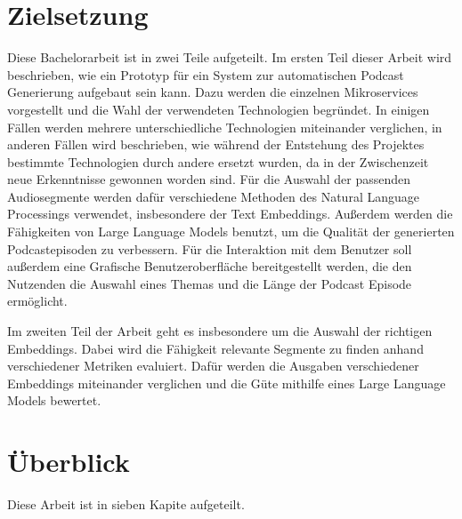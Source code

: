 



\section{Zielsetzung}

Diese Bachelorarbeit ist in zwei Teile aufgeteilt.
Im ersten Teil dieser Arbeit wird beschrieben, wie ein Prototyp für ein System zur automatischen Podcast Generierung aufgebaut sein kann.
Dazu werden die einzelnen Mikroservices vorgestellt und die Wahl der verwendeten Technologien begründet.
In einigen Fällen werden mehrere unterschiedliche Technologien miteinander verglichen, in anderen Fällen wird beschrieben, wie während der Entstehung des Projektes bestimmte Technologien durch andere ersetzt wurden, da in der Zwischenzeit neue Erkenntnisse gewonnen worden sind.
Für die Auswahl der passenden Audiosegmente werden dafür verschiedene Methoden des Natural Language Processings verwendet, insbesondere der Text Embeddings.
Außerdem werden die Fähigkeiten von Large Language Models benutzt, um die Qualität der generierten Podcastepisoden zu verbessern.
Für die Interaktion mit dem Benutzer soll außerdem eine Grafische Benutzeroberfläche bereitgestellt werden, die den Nutzenden die Auswahl eines Themas und die Länge der Podcast Episode ermöglicht.

Im zweiten Teil der Arbeit geht es insbesondere um die Auswahl der richtigen Embeddings.
Dabei wird die Fähigkeit relevante Segmente zu finden anhand verschiedener Metriken evaluiert.
Dafür werden die Ausgaben verschiedener Embeddings miteinander verglichen und die Güte mithilfe eines Large Language Models bewertet.


\section{Überblick}

Diese Arbeit ist in sieben Kapite aufgeteilt.

